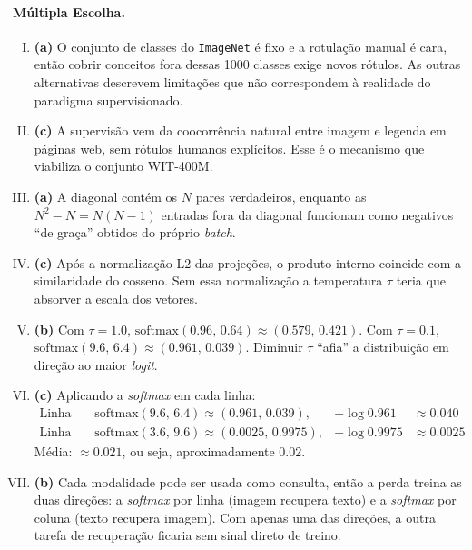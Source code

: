 \documentclass{dlproblemset}
\begin{document}
\paragraph{Múltipla Escolha.}
\begin{enumerate}[I)]
    \item \textbf{(a)} O conjunto de classes do \texttt{ImageNet} é fixo e a rotulação manual é cara, então cobrir conceitos fora dessas 1000 classes exige novos rótulos. As outras alternativas descrevem limitações que não correspondem à realidade do paradigma supervisionado.

    \item \textbf{(c)} A supervisão vem da coocorrência natural entre imagem e legenda em páginas web, sem rótulos humanos explícitos. Esse é o mecanismo que viabiliza o conjunto WIT-400M.

    \item \textbf{(a)} A diagonal contém os $N$ pares verdadeiros, enquanto as $N^2 - N = N(N-1)$ entradas fora da diagonal funcionam como negativos ``de graça'' obtidos do próprio \textit{batch}.

    \item \textbf{(c)} Após a normalização L2 das projeções, o produto interno coincide com a similaridade do cosseno. Sem essa normalização a temperatura $\tau$ teria que absorver a escala dos vetores.

    \item \textbf{(b)} Com $\tau = 1.0$, $\mathrm{softmax}(0.96,\, 0.64) \approx (0.579,\, 0.421)$. Com $\tau = 0.1$, $\mathrm{softmax}(9.6,\, 6.4) \approx (0.961,\, 0.039)$. Diminuir $\tau$ ``afia'' a distribuição em direção ao maior \textit{logit}.

    \item \textbf{(c)} Aplicando a \textit{softmax} em cada linha:
    \begin{align*}
        \text{Linha 1:}\quad & \mathrm{softmax}(9.6,\, 6.4) \approx (0.961,\, 0.039), & -\log 0.961 &\approx 0.040 \\
        \text{Linha 2:}\quad & \mathrm{softmax}(3.6,\, 9.6) \approx (0.0025,\, 0.9975), & -\log 0.9975 &\approx 0.0025
    \end{align*}
    Média: $\approx 0.021$, ou seja, aproximadamente $0.02$.

    \item \textbf{(b)} Cada modalidade pode ser usada como consulta, então a perda treina as duas direções: a \textit{softmax} por linha (imagem recupera texto) e a \textit{softmax} por coluna (texto recupera imagem). Com apenas uma das direções, a outra tarefa de recuperação ficaria sem sinal direto de treino.


\end{enumerate}
\end{document}
